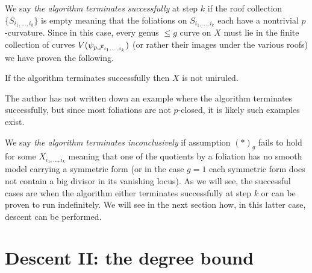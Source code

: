 \documentclass[main.tex]{subfiles}
\begin{document}
We say \textit{the algorithm terminates successfully} at step $k$ if the roof collection $\{ S_{i_1, \dots, i_k} \}$ is empty meaning that the foliations on $S_{i_1, \dots, i_{k}}$ each have a nontrivial $p$-curvature. Since in this case, every genus $\le g$ curve on $X$ must lie in the finite collection of curves $V(\psi_{p, \mathcal{F}_{i_1, \dots, i_k}})$ (or rather their images under the various roofs) we have proven the following.

\begin{theorem}
If the algorithm terminates successfully then $X$ is not uniruled.
\end{theorem}

The author has not written down an example where the algorithm terminates successfully, but since most foliations are not $p$-closed, it is likely such examples exist.

We say \textit{the algorithm terminates inconclusively} if assumption $(\ast)_{g}$ fails to hold for some $X_{i_1, \dots, i_k}$ meaning that one of the quotients by a foliation has no smooth model carrying a symmetric form (or in the case $g=1$ each symmetric form does not contain a big divisor in its vanishing locus). As we will see, the successful cases are when the algorithm either terminates successfully at step $k$ or can be proven to run indefinitely. We will see in the next section how, in this latter case, descent can be performed. 

\section{Descent II: the degree bound}
\end{document}
